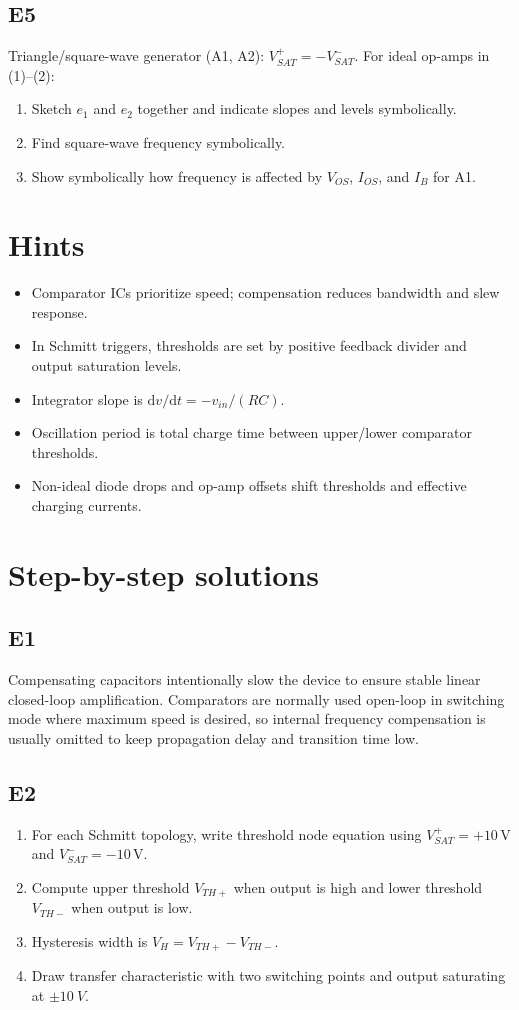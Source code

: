 \documentclass[12pt,a4paper]{article}
\begin{document}
\subsection{E5}
Triangle/square-wave generator (A1, A2): $V_{SAT}^+=-V_{SAT}^-$. For ideal op-amps in (1)--(2):
\begin{enumerate}
\item Sketch $e_1$ and $e_2$ together and indicate slopes and levels symbolically.
\item Find square-wave frequency symbolically.
\item Show symbolically how frequency is affected by $V_{OS}$, $I_{OS}$, and $I_B$ for A1.
\end{enumerate}

\section{Hints}
\begin{itemize}
\item Comparator ICs prioritize speed; compensation reduces bandwidth and slew response.
\item In Schmitt triggers, thresholds are set by positive feedback divider and output saturation levels.
\item Integrator slope is $\mathrm{d}v/\mathrm{d}t=-v_{in}/(RC)$.
\item Oscillation period is total charge time between upper/lower comparator thresholds.
\item Non-ideal diode drops and op-amp offsets shift thresholds and effective charging currents.
\end{itemize}

\section{Step-by-step solutions}
\subsection{E1}
Compensating capacitors intentionally slow the device to ensure stable linear closed-loop amplification. Comparators are normally used open-loop in switching mode where maximum speed is desired, so internal frequency compensation is usually omitted to keep propagation delay and transition time low.

\subsection{E2}
\begin{enumerate}
\item For each Schmitt topology, write threshold node equation using $V_{SAT}^+=+10\,\text{V}$ and $V_{SAT}^-=-10\,\text{V}$.
\item Compute upper threshold $V_{TH+}$ when output is high and lower threshold $V_{TH-}$ when output is low.
\item Hysteresis width is $V_H=V_{TH+}-V_{TH-}$.
\item Draw transfer characteristic with two switching points and output saturating at $\pm\SI{10}{V}$.
\end{enumerate}
\end{document}
